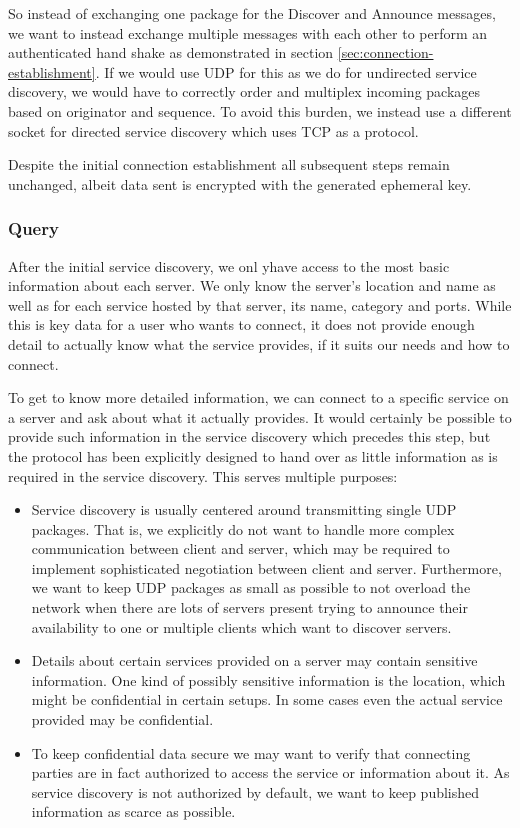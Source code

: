 So instead of exchanging one package for the Discover and Announce messages, we want to instead exchange multiple messages with each other to perform an authenticated hand shake as demonstrated in section \ref{sec:connection-establishment}.
If we would use UDP for this as we do for undirected service discovery, we would have to correctly order and multiplex incoming packages based on originator and sequence.
To avoid this burden, we instead use a different socket for directed service discovery which uses TCP as a protocol.

Despite the initial connection establishment all subsequent steps remain unchanged, albeit data sent is encrypted with the generated ephemeral key.

\subsubsection{Query}
\label{sec:query}

After the initial service discovery, we onl yhave access to the most basic information about each server.
We only know the server's location and name as well as for each service hosted by that server, its name, category and ports.
While this is key data for a user who wants to connect, it does not provide enough detail to actually know what the service provides, if it suits our needs and how to connect.

To get to know more detailed information, we can connect to a specific service on a server and ask about what it actually provides.
It would certainly be possible to provide such information in the service discovery which precedes this step, but the protocol has been explicitly designed to hand over as little information as is required in the service discovery.
This serves multiple purposes:
\begin{itemize}
    \item Service discovery is usually centered around transmitting single UDP packages.
        That is, we explicitly do not want to handle more complex communication between client and server, which may be required to implement sophisticated negotiation between client and server.
        Furthermore, we want to keep UDP packages as small as possible to not overload the network when there are lots of servers present trying to announce their availability to one or multiple clients which want to discover servers.
    \item Details about certain services provided on a server may contain sensitive information.
        One kind of possibly sensitive information is the location, which might be confidential in certain setups.
        In some cases even the actual service provided may be confidential.
    \item To keep confidential data secure we may want to verify that connecting parties are in fact authorized to access the service or information about it.
        As service discovery is not authorized by default, we want to keep published information as scarce as possible.
\end{itemize}

